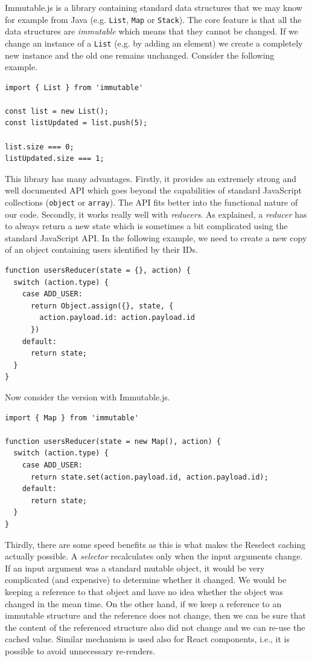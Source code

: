 Immutable.js \cite{immutable} is a library containing  standard data structures that we may know for example from Java (e.g. \texttt{List}, \texttt{Map} or \texttt{Stack}). The core feature is that all the data structures are \emph{immutable} which means that they cannot be changed. If we change an instance of a \texttt{List} (e.g. by adding an element) we create a completely new instance and the old one remains unchanged. Consider the following example.

\begin{verbatim}
import { List } from 'immutable'

const list = new List();
const listUpdated = list.push(5);

list.size === 0;
listUpdated.size === 1;
\end{verbatim}

This library has many advantages. Firstly, it provides an extremely strong and well documented API which goes beyond the capabilities of standard JavaScript collections (\texttt{object} or \texttt{array}). The API fits better into the functional nature of our code. Secondly, it works really well with \emph{reducers}. As explained, a \emph{reducer} has to always return a new state which is sometimes a bit complicated using the standard JavaScript API. In the following example, we need to create a new copy of an object containing users identified by their IDs.

\begin{verbatim}
function usersReducer(state = {}, action) {
  switch (action.type) {
    case ADD_USER: 
      return Object.assign({}, state, {
        action.payload.id: action.payload.id
      })
    default:
      return state;
  }
}
\end{verbatim}

Now consider the version with Immutable.js.

\begin{verbatim}
import { Map } from 'immutable'

function usersReducer(state = new Map(), action) {
  switch (action.type) {
    case ADD_USER: 
      return state.set(action.payload.id, action.payload.id);
    default:
      return state;
  }
}
\end{verbatim}

Thirdly, there are some speed benefits as this is what makes the Reselect caching actually possible. A \emph{selector} recalculates only when the input arguments change. If an input argument was a standard mutable object, it would be very complicated (and expensive) to determine whether it changed. We would be keeping a reference to that object and have no idea whether the object was changed in the mean time. On the other hand, if we keep a reference to an immutable structure and the reference does not change, then we can be sure that the content of the referenced structure also did not change and we can re-use the cached value. Similar mechanism is used also for React components, i.e., it is possible to avoid unnecessary re-renders.

